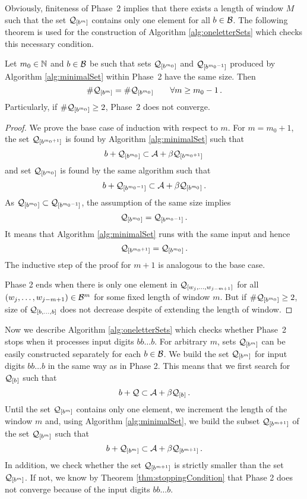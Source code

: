 Obviously, finiteness of Phase~2 implies that there exists a length of window $M$ such that the set $\mathcal{Q}_{[b^{m}]}$ contains only one element for all $b\in\mathcal{B}$. 
The following theorem is used for the construction of Algorithm \ref{alg:oneletterSets} which checks this necessary condition. 

\begin{theo}
\label{thm:stoppingCondition}
Let $m_0 \in \mathbb{N}$ and $b\in\mathcal{B}$ be such that sets $\mathcal{Q}_{[b^{m_0}]}$ and $\mathcal{Q}_{[b^{m_0-1}]}$ produced by Algorithm \ref{alg:minimalSet} within Phase~2 have the same size. Then
$$
    \#\mathcal{Q}_{[b^{m}]} = \#\mathcal{Q}_{[b^{m_0}]} \qquad \forall m\geq m_0-1\,.
$$ 
Particularly, if $\#\mathcal{Q}_{[b^{m_0}]}\geq 2$, Phase~2 does not converge.
\end{theo}
\begin{proof}
We prove the base case of induction with respect to $m$. For $m=m_0+1$, the set $\mathcal{Q}_{[b^{m_0+1}]}$ is found by Algorithm \ref{alg:minimalSet} such that 
$$
b + \mathcal{Q}_{[b^{m_0}]} \subset \mathcal{A} + \beta \mathcal{Q}_{[b^{m_0+1}]}\,
$$
and set $\mathcal{Q}_{[b^{m_0}]}$ is found by the same algorithm such that
$$
b + \mathcal{Q}_{[b^{m_0-1}]} \subset \mathcal{A} + \beta \mathcal{Q}_{[b^{m_0}]}\,.
$$
As $\mathcal{Q}_{[b^{m_0}]} \subset \mathcal{Q}_{[b^{m_0-1}]}$, the assumption of the same size implies
$$
    \mathcal{Q}_{[b^{m_0}]} = \mathcal{Q}_{[b^{m_0-1}]}\,.
$$
It means that Algorithm \ref{alg:minimalSet} runs with the same input and hence
$$
\mathcal{Q}_{[b^{m_0+1}]}=\mathcal{Q}_{[b^{m_0}]}\,.
$$
The inductive step of the proof for $m+1$ is analogous to the base case.

Phase 2 ends when there is only one element in $\mathcal{Q}_{[w_j,\dots, w_{j-m+1}]}$ for all $(w_j,\dots, w_{j-m+1}) \in \mathcal{B}^m$ for some fixed length of window $m$. But if $\#\mathcal{Q}_{[b^{m_0}]}\geq 2$, size of $\mathcal{Q}_{[b,\dots,b]}$ does not decrease despite of extending the length of window.
\end{proof}

 Now we describe Algorithm \ref{alg:oneletterSets} which checks whether Phase~2 stops when it processes input digits $bb\dots b$.
For arbitrary $m$, sets $\mathcal{Q}_{[b^{m}]}$  can be easily constructed separately for each $b\in\mathcal{B}$. We build the set $\mathcal{Q}_{[b^{m}]}$ for input digits $bb\dots b$ in the same way as in Phase 2. This means that we first search for $\mathcal{Q}_{[b^{}]}$ such that 
$$
b + \mathcal{Q} \subset \mathcal{A} + \beta \mathcal{Q}_{[b^{}]}\,.
$$
Until the set $\mathcal{Q}_{[b^{m}]}$ contains only one element, we increment the length of the window $m$ and, using Algorithm \ref{alg:minimalSet}, we build the subset $\mathcal{Q}_{[b^{m+1}]}$ of the set $\mathcal{Q}_{[b^{m}]}$ such that
$$
b + \mathcal{Q}_{[b^{m}]} \subset \mathcal{A} + \beta \mathcal{Q}_{[b^{m+1}]}\,.
$$
In addition, we check whether the set $\mathcal{Q}_{[b^{m+1}]}$ is strictly smaller than the set $\mathcal{Q}_{[b^{m}]}$. If not, we know by Theorem \ref{thm:stoppingCondition} that Phase 2 does not converge because of the input digits $bb\dots b$.

